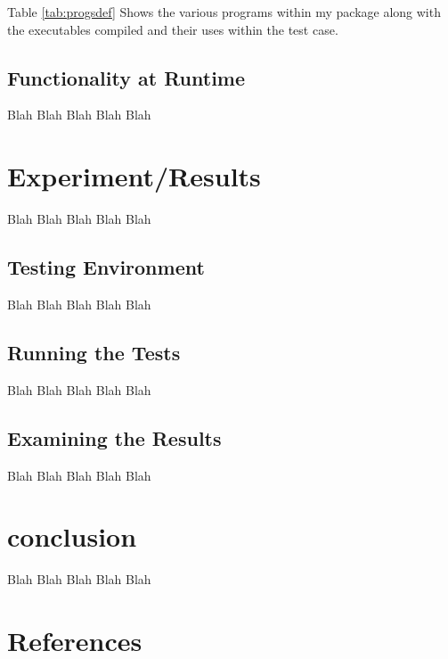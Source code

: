 \documentclass{article}
\begin{document}
    Table \ref{tab:progsdef} Shows the various programs within my package along with the executables compiled and their uses within the test case.

    \subsection{Functionality at Runtime}\label{subsec:funcrun}
    Blah Blah Blah Blah Blah

    \section{Experiment/Results}\label{sec:ex/res}
    Blah Blah Blah Blah Blah
    \subsection{Testing Environment}\label{subsec:environment}
    Blah Blah Blah Blah Blah
    \subsection{Running the Tests}\label{subsec:runtests}
    Blah Blah Blah Blah Blah
    \subsection{Examining the Results}\label{subsec:examineres}
    Blah Blah Blah Blah Blah

    \section{conclusion}\label{sec:conclusion}
    Blah Blah Blah Blah Blah

    \section{References}\label{sec:refs}
\end{document}
